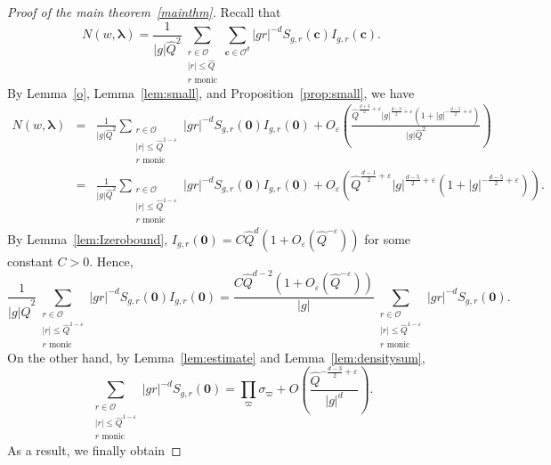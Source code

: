 \documentclass[11pt]{amsart}
\theoremstyle{plain}
\theoremstyle{plain}
\renewcommand{\vec}[1]{\mathbf{#1}}
\theoremstyle{remark}
\theoremstyle{definition}
\renewcommand{\hat}{\widehat}
\newcommand{\hQ}{\widehat{Q}}
\newcommand{\cO}{\mathcal{O}}
\begin{document}
\begin{proof}[Proof of the main theorem~\ref{mainthm}] Recall that
\begin{equation}\label{newequu}N(w,\boldsymbol{\lambda})=\frac{1}{|g|\hQ^2}\sum_{\substack{
r\in \cO\\
|r|\leq \hat Q\\
\text{$r$ monic}
} }\sum_{\vec{c}\in\mathcal{O}^d}|gr|^{-d}S_{g,r}(\vec{c})I_{g,r}(\vec{c}).\end{equation}
By Lemma~\ref{o}, Lemma~\ref{lem:small}, and Proposition~\ref{prop:small}, we have
\begin{eqnarray*}N(w,\boldsymbol{\lambda})&=&\frac{1}{|g|\hQ^2}\sum_{\substack{r\in \cO\\|r|\leq \hat Q^{1-\varepsilon}\\ \text{$r$ monic}}}|gr|^{-d}S_{g,r}(\vec{0})I_{g,r}(\vec{0})+O_{\varepsilon}\left(\frac{\hQ^{\frac{d+3}{2}+\varepsilon}|g|^{\frac{d-3}{2}+\varepsilon}(1+|g|^{-\frac{d-5}{2}+\varepsilon})}{|g|\hQ^2}\right)\\&=&\frac{1}{|g|\hQ^2}\sum_{\substack{r\in \cO\\|r|\leq \hat Q^{1-\varepsilon}\\ \text{$r$ monic}}}|gr|^{-d}S_{g,r}(\vec{0})I_{g,r}(\vec{0})+O_{\varepsilon}\left(\hQ^{\frac{d-1}{2}+\varepsilon}|g|^{\frac{d-5}{2}+\varepsilon}(1+|g|^{-\frac{d-5}{2}+\varepsilon})\right).\end{eqnarray*}
By Lemma~\ref{lem:Izerobound}, $I_{g,r}(\vec{0})=C\hQ^d(1+O_{\varepsilon}(\hQ^{-\varepsilon}))$ for some constant $C>0$. Hence,
\[\frac{1}{|g|\hQ^2}\sum_{\substack{r\in \cO\\|r|\leq \hat Q^{1-\varepsilon}\\ \text{$r$ monic}}}|gr|^{-d}S_{g,r}(\vec{0})I_{g,r}(\vec{0})=\frac{C\hQ^{d-2}(1+O_{\varepsilon}(\hQ^{-\varepsilon}))}{|g|}\sum_{\substack{r\in \cO\\|r|\leq \hat Q^{1-\varepsilon}\\ \text{$r$ monic}}}|gr|^{-d}S_{g,r}(\vec{0}).\]
On the other hand, by Lemma~\ref{lem:estimate} and Lemma~\ref{lem:densitysum}, 
\[\sum_{\substack{r\in \cO\\|r|\leq \hat Q^{1-\varepsilon}\\ \text{$r$ monic}}}|gr|^{-d}S_{g,r}(\vec{0})=\prod_{\varpi}\sigma_{\varpi}+O\left(\frac{\hQ^{-\frac{d-3}{2}+\varepsilon}}{|g|^d}\right).\]
As a result, we finally obtain

\end{proof}
\end{document}
